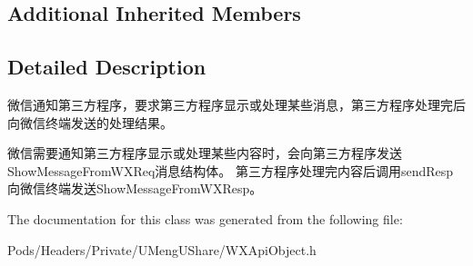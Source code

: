 \subsection*{Additional Inherited Members}


\subsection{Detailed Description}
微信通知第三方程序，要求第三方程序显示或处理某些消息，第三方程序处理完后向微信终端发送的处理结果。 

微信需要通知第三方程序显示或处理某些内容时，会向第三方程序发送\+Show\+Message\+From\+W\+X\+Req消息结构体。 第三方程序处理完内容后调用send\+Resp向微信终端发送\+Show\+Message\+From\+W\+X\+Resp。 

The documentation for this class was generated from the following file\+:\begin{DoxyCompactItemize}
\item 
Pods/\+Headers/\+Private/\+U\+Meng\+U\+Share/W\+X\+Api\+Object.\+h\end{DoxyCompactItemize}
